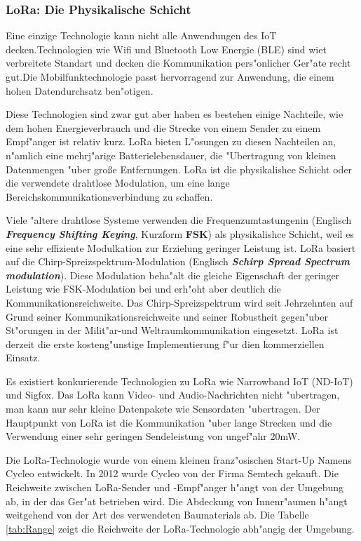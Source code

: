 \subsubsection{LoRa: Die Physikalische Schicht}

Eine einzige Technologie kann nicht alle Anwendungen des IoT decken.Technologien wie Wifi und Bluetooth Low Energie (BLE) sind wiet verbreitete Standart und decken die Kommunikation pers"onlicher Ger"ate recht gut.Die Mobilfunktechnologie passt hervorragend zur Anwendung, die einem hohen Datendurchsatz ben"otigen.

Diese Technologien sind zwar gut aber haben es bestehen einige Nachteile, wie dem hohen Energieverbrauch und die Strecke von einem Sender zu einem Empf"anger ist relativ kurz. LoRa bieten L"osungen zu diesen Nachteilen an, n"amlich eine mehrj"arige Batterielebensdauer, die "Ubertragung von kleinen Datenmengen "uber gro\ss{}e Entfernungen. LoRa ist die physikalishce Schicht oder die verwendete drahtlose Modulation, um eine lange Bereichskommunikationsverbindung zu schaffen. 

Viele "altere drahtlose Systeme verwenden die Frequenzumtastungenin (Englisch \textbf{\textit{Frequency Shifting Keying}}, Kurzform \textbf{FSK}) als physikalishce Schicht, weil es eine sehr effiziente Modulkation zur Erzielung geringer Leistung ist. LoRa basiert auf die Chirp-Spreizspektrum-Modulation (Englisch \textbf{\textit{Schirp Spread Spectrum modulation}}). Diese Modulation beha"alt die gleiche Eigenschaft der geringer Leistung wie FSK-Modulation bei und erh"oht aber deutlich die Kommunikationsreichweite. Das Chirp-Spreizspektrum wird seit Jehrzehnten auf Grund seiner Kommunikationsreichweite und seiner Robustheit gegen"uber St"orungen in der Milit"ar-und Weltraumkommunikation eingesetzt. LoRa ist derzeit die erste kosteng"unstige Implementierung f"ur dien kommerziellen Einsatz.

Es existiert konkurierende Technologien zu LoRa  wie Narrowband IoT (ND-IoT) und Sigfox. Das LoRa kann  Video- und Audio-Nachrichten nicht "ubertragen, man kann nur sehr kleine Datenpakete wie Sensordaten "ubertragen. Der Hauptpunkt von LoRa ist die Kommunikation "uber lange Strecken und die Verwendung einer sehr geringen Sendeleistung von ungef"ahr 20mW.

Die LoRa-Technologie wurde von einem kleinen franz"osischen Start-Up Namens Cycleo entwickelt. In 2012 wurde Cycleo von der Firma Semtech gekauft. Die Reichweite zwischen LoRa-Sender und -Empf"anger h"angt von der Umgebung ab, in der das Ger"at betrieben wird. Die Abdeckung von Innenr"aumen h"angt weitgehend von der Art des verwendeten Baumaterials ab. Die Tabelle \ref{tab:Range} zeigt die Reichweite der LoRa-Technologie abh"angig der Umgebung.

